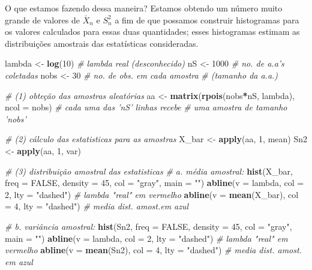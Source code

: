\documentclass[
]{book}
\newenvironment{Shaded}{\begin{snugshade}}{\end{snugshade}}
\newcommand{\CommentTok}[1]{\textcolor[rgb]{0.56,0.35,0.01}{\textit{#1}}}
\newcommand{\DataTypeTok}[1]{\textcolor[rgb]{0.13,0.29,0.53}{#1}}
\newcommand{\DecValTok}[1]{\textcolor[rgb]{0.00,0.00,0.81}{#1}}
\newcommand{\KeywordTok}[1]{\textcolor[rgb]{0.13,0.29,0.53}{\textbf{#1}}}
\newcommand{\NormalTok}[1]{#1}
\newcommand{\OperatorTok}[1]{\textcolor[rgb]{0.81,0.36,0.00}{\textbf{#1}}}
\newcommand{\OtherTok}[1]{\textcolor[rgb]{0.56,0.35,0.01}{#1}}
\newcommand{\StringTok}[1]{\textcolor[rgb]{0.31,0.60,0.02}{#1}}
\theoremstyle{definition}
\theoremstyle{definition}
\theoremstyle{definition}
\theoremstyle{remark}
\begin{document}
O que estamos fazendo dessa maneira? Estamos obtendo um número muito grande de valores de \(\bar{X}_n\) e \(S_n^2\) a fim de que possamos construir histogramas para os valores calculados para essas duas quantidades; esses histogramas estimam as distribuições amostrais das estatísticas consideradas.

\begin{Shaded}
\begin{Highlighting}[]
\NormalTok{lambda <-}\StringTok{ }\KeywordTok{log}\NormalTok{(}\DecValTok{10}\NormalTok{)  }\CommentTok{# lambda real (desconhecido)}
\NormalTok{nS     <-}\StringTok{ }\DecValTok{1000}     \CommentTok{# no. de a.a's coletadas}
\NormalTok{nobs   <-}\StringTok{ }\DecValTok{30}       \CommentTok{# no. de obs. em cada amostra }
                   \CommentTok{# (tamanho da a.a.)}

\CommentTok{# (1) obteção das amostras aleatórias}
\NormalTok{aa <-}\StringTok{ }\KeywordTok{matrix}\NormalTok{(}\KeywordTok{rpois}\NormalTok{(nobs}\OperatorTok{*}\NormalTok{nS, lambda), }\DataTypeTok{ncol =}\NormalTok{ nobs) }
\CommentTok{# cada uma das 'nS' linhas recebe }
\CommentTok{# uma amostra de tamanho 'nobs'}

\CommentTok{# (2) cálculo das estatisticas para as amostras}
\NormalTok{X_bar <-}\StringTok{ }\KeywordTok{apply}\NormalTok{(aa, }\DecValTok{1}\NormalTok{, mean)}
\NormalTok{Sn2   <-}\StringTok{ }\KeywordTok{apply}\NormalTok{(aa, }\DecValTok{1}\NormalTok{, var) }

\CommentTok{# (3) distribuição amostral das estatisticas}
\CommentTok{# a. média amostral:}
\KeywordTok{hist}\NormalTok{(X_bar, }\DataTypeTok{freq =} \OtherTok{FALSE}\NormalTok{,}
     \DataTypeTok{density =} \DecValTok{45}\NormalTok{, }\DataTypeTok{col =} \StringTok{"gray"}\NormalTok{,}
     \DataTypeTok{main =} \StringTok{""}\NormalTok{)}
\KeywordTok{abline}\NormalTok{(}\DataTypeTok{v =}\NormalTok{ lambda, }\DataTypeTok{col =} \DecValTok{2}\NormalTok{, }\DataTypeTok{lty =} \StringTok{"dashed"}\NormalTok{)      }\CommentTok{# lambda "real" em  vermelho}
\KeywordTok{abline}\NormalTok{(}\DataTypeTok{v =} \KeywordTok{mean}\NormalTok{(X_bar), }\DataTypeTok{col =} \DecValTok{4}\NormalTok{, }\DataTypeTok{lty =} \StringTok{"dashed"}\NormalTok{) }\CommentTok{# media dist. amost.em  azul}

\CommentTok{# b. variância amostral:}
\KeywordTok{hist}\NormalTok{(Sn2, }\DataTypeTok{freq =} \OtherTok{FALSE}\NormalTok{,}
     \DataTypeTok{density =} \DecValTok{45}\NormalTok{, }\DataTypeTok{col =} \StringTok{"gray"}\NormalTok{,}
     \DataTypeTok{main =} \StringTok{""}\NormalTok{)}
\KeywordTok{abline}\NormalTok{(}\DataTypeTok{v =}\NormalTok{ lambda, }\DataTypeTok{col =} \DecValTok{2}\NormalTok{, }\DataTypeTok{lty =} \StringTok{"dashed"}\NormalTok{)      }\CommentTok{# lambda "real" em  vermelho}
\KeywordTok{abline}\NormalTok{(}\DataTypeTok{v =} \KeywordTok{mean}\NormalTok{(Sn2), }\DataTypeTok{col =} \DecValTok{4}\NormalTok{, }\DataTypeTok{lty =} \StringTok{"dashed"}\NormalTok{)   }\CommentTok{# media dist. amost. em  azul}
\end{Highlighting}
\end{Shaded}
\end{document}

